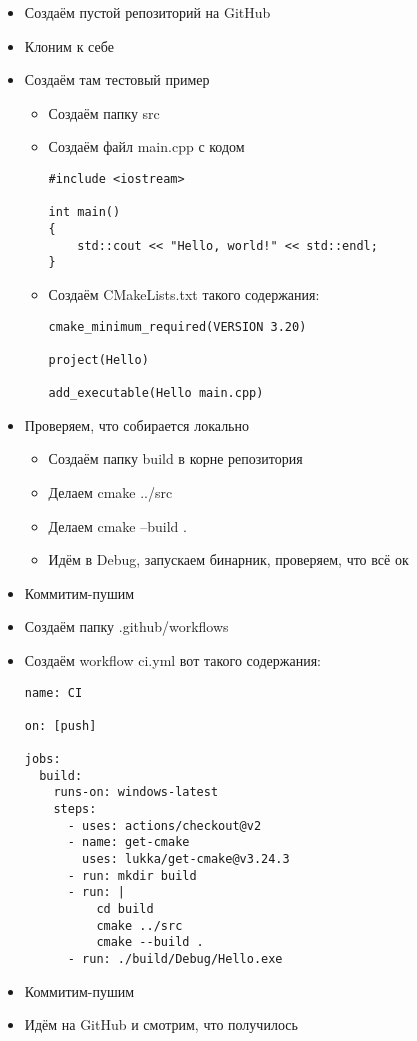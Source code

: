 \documentclass{../../text-style}
\begin{document}
\maketitle
\thispagestyle{empty}

\begin{itemize}
    \item Создаём пустой репозиторий на GitHub
    \item Клоним к себе
    \item Создаём там тестовый пример
    \begin{itemize}
        \item Создаём папку src
        \item Создаём файл main.cpp с кодом
            \begin{verbatim}
#include <iostream>

int main() 
{
    std::cout << "Hello, world!" << std::endl;
}
            \end{verbatim}
        \item Создаём CMakeLists.txt такого содержания:
            \begin{verbatim}
cmake_minimum_required(VERSION 3.20)

project(Hello)

add_executable(Hello main.cpp)
            \end{verbatim}
    \end{itemize}
    \item Проверяем, что собирается локально
    \begin{itemize}
        \item Создаём папку build в корне репозитория
        \item Делаем cmake ../src
        \item Делаем cmake --build .
        \item Идём в Debug, запускаем бинарник, проверяем, что всё ок
    \end{itemize}
    \item Коммитим-пушим
    \item Создаём папку .github/workflows
    \item Создаём workflow ci.yml вот такого содержания:
    \begin{verbatim}
name: CI

on: [push]

jobs:
  build:
    runs-on: windows-latest
    steps:
      - uses: actions/checkout@v2
      - name: get-cmake
        uses: lukka/get-cmake@v3.24.3
      - run: mkdir build
      - run: |
          cd build 
          cmake ../src
          cmake --build .
      - run: ./build/Debug/Hello.exe
    \end{verbatim}
    \item Коммитим-пушим
    \item Идём на GitHub и смотрим, что получилось
\end{itemize}
\end{document}
